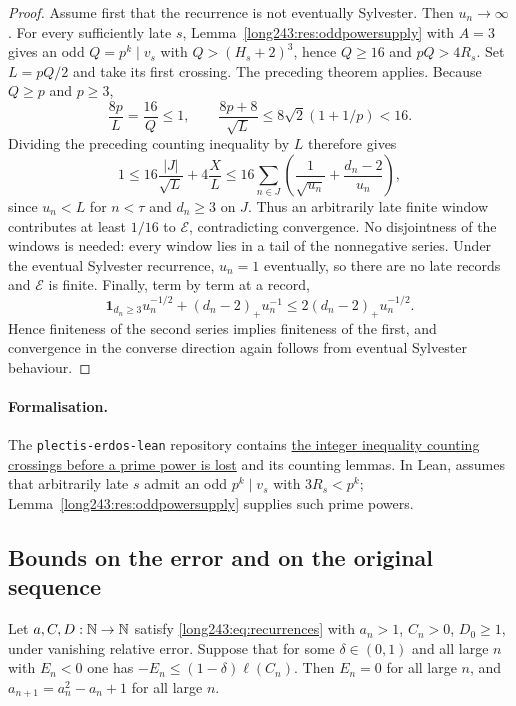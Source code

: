 \documentclass[11pt]{article}
\begin{document}
\begin{proof}
Assume first that the recurrence is not eventually Sylvester. Then $u_n\to\infty$.
For every sufficiently late $s$, Lemma~\ref{long243:res:oddpowersupply}
with $A=3$ gives an odd $Q=p^k\mid v_s$ with
$Q>(H_s+2)^3$, hence $Q\ge16$ and $pQ>4R_s$.
Set $L=pQ/2$ and take its first crossing. The preceding theorem applies.
Because $Q\ge p$ and $p\ge3$,
\[
 \frac{8p}{L}=\frac{16}{Q}\le1,
 \qquad \frac{8p+8}{\sqrt L}
 \le8\sqrt2(1+1/p)<16.
\]
Dividing the preceding counting inequality by $L$ therefore gives
\[
 1\le16\frac{|J|}{\sqrt L}+4\frac{X}{L}
 \le16\sum_{n\in J}\left(\frac1{\sqrt{u_n}}+
                  \frac{d_n-2}{u_n}\right),
\]
since $u_n<L$ for $n<\tau$ and $d_n\ge3$ on $J$.
Thus an arbitrarily late finite window contributes at least $1/16$ to
$\mathcal E$, contradicting convergence. No disjointness of the windows is
needed: every window lies in a tail of the nonnegative series.
Under the eventual Sylvester recurrence, $u_n=1$ eventually, so there are no late records and
$\mathcal E$ is finite.
Finally, term by term at a record,
\[
 \mathbf1_{d_n\ge3}u_n^{-1/2}+(d_n-2)_+u_n^{-1}
 \le2(d_n-2)_+u_n^{-1/2}.
\]
Hence finiteness of the second series implies finiteness of the first,
and convergence in the converse direction again follows from eventual Sylvester behaviour.
\end{proof}

\paragraph{Formalisation.}
The \texttt{plectis-erdos-lean} repository contains
\href{https://github.com/wcook04/plectis-erdos-lean/blob/52f29ad173b04e3bac941b3663f2b9aebe5de0bb/ErdosProblems/Erdos243/ProtectedEpochEnergy.lean\#L185}{the integer inequality counting crossings before a prime power is lost}
and its counting lemmas.
In Lean,
assumes that arbitrarily late $s$ admit an odd $p^k\mid v_s$ with
$3R_s<p^k$; Lemma~\ref{long243:res:oddpowersupply} supplies such prime
powers.

\subsection{Bounds on the error and on the original sequence}

\begin{theorem}\label{long243:res:slownegative}
Let $a,C,D:\mathbb{N}\to\mathbb{N}$ satisfy \eqref{long243:eq:recurrences} with $a_n>1$, $C_n>0$, $D_0\ge1$, under
vanishing relative error.  Suppose that for some $\delta\in(0,1)$ and all large $n$
with $E_n<0$ one has $-E_n\le(1-\delta)\ell(C_n)$.  Then $E_n=0$ for all large
$n$, and $a_{n+1}=a_n^2-a_n+1$ for all large $n$.
\end{theorem}
\end{document}
